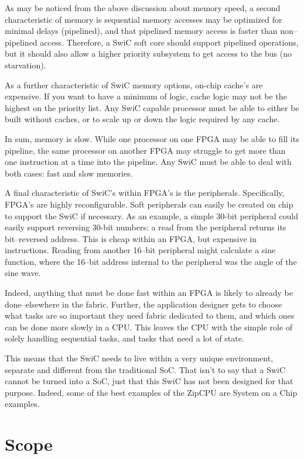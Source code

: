 \documentclass{gqtekspec}
\begin{document}
As may be noticed from the above discussion about memory speed, a second
characteristic of memory is sequential memory accesses may be optimized for
minimal delays (pipelined), and that pipelined memory access is faster than
non--pipelined access.  Therefore, a SwiC soft core should support pipelined
operations, but it should also allow a higher priority subsystem to get access
to the bus (no starvation).

As a further characteristic of SwiC memory options, on-chip cache's are
expensive.  If you want to have a minimum of logic, cache logic may not be
the highest on the priority list.  Any SwiC capable processor must be able
to either be built without caches, or to scale up or down the logic required
by any cache.

In sum, memory is slow.  While one processor on one FPGA may be able to fill
its pipeline, the same processor on another FPGA may struggle to get more than
one instruction at a time into the pipeline.  Any SwiC must be able to deal
with both cases: fast and slow memories.

A final characteristic of SwiC's within FPGA's is the peripherals. 
Specifically, FPGA's are highly reconfigurable.  Soft peripherals can easily
be created on chip to support the SwiC if necessary.  As an example, a simple
30-bit peripheral could easily support reversing 30-bit numbers: a read from
the peripheral returns its bit--reversed address.  This is cheap within an
FPGA, but expensive in instructions.  Reading from another 16--bit peripheral
might calculate a sine function, where the 16--bit address internal to the
peripheral was the angle of the sine wave.

Indeed, anything that must be done fast within an FPGA is likely to already
be done--elsewhere in the fabric.  Further, the application designer gets to
choose what tasks are so important they need fabric dedicated to them, and which
ones can be done more slowly in a CPU.  This leaves the CPU with the simple role
of solely handling sequential tasks, and tasks that need a lot of state.

This means that the SwiC needs to live within a very unique environment,
separate and different from the traditional SoC.  That isn't to say that a 
SwiC cannot be turned into a SoC, just that this SwiC has not been designed
for that purpose.  Indeed, some of the best examples of the ZipCPU are
System on a Chip examples.

\section{Scope}\label{sec:limits}
\end{document}
